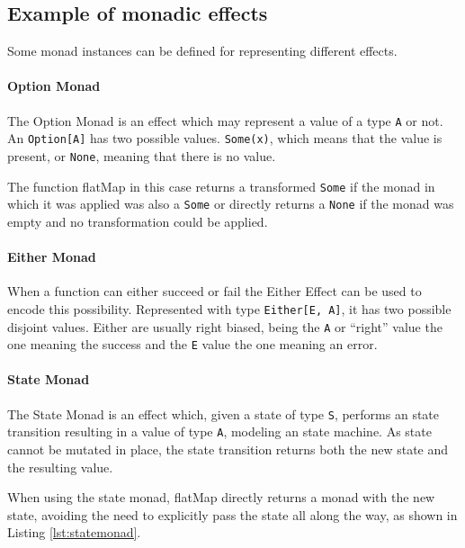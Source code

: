 \documentclass[../main.tex]{subfiles}
\begin{document}
\subsection{Example of monadic effects}
Some monad instances can be defined for representing different effects.

\paragraph{Option Monad}
The Option Monad is an effect which may represent a value of a type \texttt{A} or
not. An \texttt{Option[A]} has two possible values. \texttt{Some(x)}, which means
that the value is present, or \texttt{None}, meaning that there is no value.

The function flatMap in this case returns a transformed \texttt{Some} if the monad in which
it was applied was also a \texttt{Some} or directly returns a \texttt{None} if
the monad was empty and no transformation could be applied.



\paragraph{Either Monad}
When a function can either succeed or fail the Either Effect can be used to encode this
possibility. Represented with type \texttt{Either[E, A]}, it has two possible
disjoint values. Either are usually right biased, being the \texttt{A} or
``right'' value the one meaning the success and the \texttt{E} value the one
meaning an error.



\paragraph{State Monad}
The State Monad is an effect which, given a state of type \texttt{S}, performs an state
transition resulting in a value of type \texttt{A}, modeling an state machine.
As state cannot be mutated in place, the state transition returns both the new
state and the resulting value. 

When using the state monad, flatMap directly returns a monad with the new state,
avoiding the need to explicitly pass the state all along the way, as shown in Listing \ref{lst:statemonad}.
\end{document}
